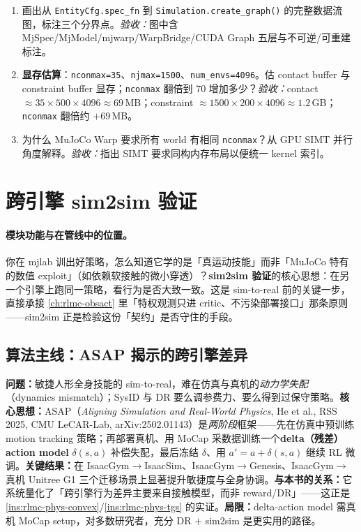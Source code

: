 \begin{practice}[本节练习]
\begin{enumerate}
  \item 画出从 \verb|EntityCfg.spec_fn| 到 \verb|Simulation.create_graph()| 的完整数据流图，标注三个分界点。\emph{验收：}图中含 MjSpec/MjModel/mjwarp/WarpBridge/CUDA Graph 五层与不可逆/可重建标注。
  \item \textbf{显存估算}：\verb|nconmax=35|、\verb|njmax=1500|、\verb|num_envs=4096|。估 contact buffer 与 constraint buffer 显存；\verb|nconmax| 翻倍到 70 增加多少？\emph{验收：}contact $\approx35\times500\times4096\approx69$\,MB；constraint $\approx1500\times200\times4096\approx1.2$\,GB；\verb|nconmax| 翻倍约 $+69$\,MB。
  \item 为什么 MuJoCo Warp 要求所有 world 有相同 \verb|nconmax|？从 GPU SIMT 并行角度解释。\emph{验收：}指出 SIMT 要求同构内存布局以便统一 kernel 索引。
\end{enumerate}
\end{practice}

\section{跨引擎 sim2sim 验证}
\label{sec:rlmc-phys-sim2sim}

\paragraph{模块功能与在管线中的位置。}你在 mjlab 训出好策略，怎么知道它学的是「真运动技能」而非「MuJoCo 特有的数值 exploit」（如依赖软接触的微小穿透）？\textbf{sim2sim 验证}的核心思想：在另一个引擎上跑同一策略，看行为是否大致一致。这是 sim-to-real 前的关键一步，直接承接 \cref{ch:rlmc-obsact} 里「特权观测只进 critic、不污染部署接口」那条原则——sim2sim 正是检验这份「契约」是否守住的手段。

\subsection{算法主线：ASAP 揭示的跨引擎差异}

\begin{paper}\label{paper:rlmc-phys-asap}
\textbf{问题：}敏捷人形全身技能的 sim-to-real，难在仿真与真机的\emph{动力学失配}（dynamics mismatch）；SysID 与 DR 要么调参费力、要么得到过保守策略。\textbf{核心思想：}ASAP（\emph{Aligning Simulation and Real-World Physics}, He et al., RSS 2025, CMU LeCAR-Lab, arXiv:2502.01143）\cite{asap2025}是\emph{两阶段}框架——先在仿真中预训练 motion tracking 策略；再部署真机、用 MoCap 采数据训练一个\textbf{delta（残差）action model} $\delta(s,a)$ 补偿失配，最后冻结 $\delta$、用 $a'=a+\delta(s,a)$ 继续 RL 微调。\textbf{关键结果：}在 IsaacGym$\to$IsaacSim、IsaacGym$\to$Genesis、IsaacGym$\to$真机 Unitree G1 三个迁移场景上显著提升敏捷度与全身协调。\textbf{与本书的关系：}它系统量化了「跨引擎行为差异主要来自接触模型，而非 reward/DR」——这正是 \cref{ins:rlmc-phys-convex}/\cref{ins:rlmc-phys-tgs} 的实证。\textbf{局限：}delta-action model 需真机 MoCap setup，对多数研究者，充分 DR $+$ sim2sim 是更实用的路径。
\end{paper}

